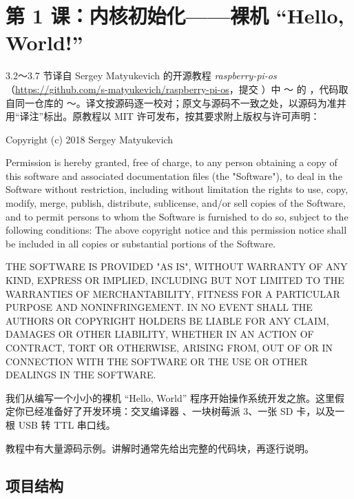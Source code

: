 \section{第 1 课：内核初始化——裸机 “Hello, World!”}
\label{sec:rpios-l1}

\begin{note}
  3.2～3.7 节译自 Sergey Matyukevich 的开源教程 \emph{raspberry-pi-os}（\url{https://github.com/s-matyukevich/raspberry-pi-os}，提交 ）中 ～ 的 ，代码取自同一仓库的 ～。译文按源码逐一校对；原文与源码不一致之处，以源码为准并用“译注”标出。原教程以 MIT 许可发布，按其要求附上版权与许可声明：

  \smallskip
  {\footnotesize\ttfamily\raggedright
  Copyright (c) 2018 Sergey Matyukevich\par
  Permission is hereby granted, free of charge, to any person obtaining a copy of this software and associated documentation files (the "Software"), to deal in the Software without restriction, including without limitation the rights to use, copy, modify, merge, publish, distribute, sublicense, and/or sell copies of the Software, and to permit persons to whom the Software is furnished to do so, subject to the following conditions: The above copyright notice and this permission notice shall be included in all copies or substantial portions of the Software.\par
  THE SOFTWARE IS PROVIDED "AS IS", WITHOUT WARRANTY OF ANY KIND, EXPRESS OR IMPLIED, INCLUDING BUT NOT LIMITED TO THE WARRANTIES OF MERCHANTABILITY, FITNESS FOR A PARTICULAR PURPOSE AND NONINFRINGEMENT. IN NO EVENT SHALL THE AUTHORS OR COPYRIGHT HOLDERS BE LIABLE FOR ANY CLAIM, DAMAGES OR OTHER LIABILITY, WHETHER IN AN ACTION OF CONTRACT, TORT OR OTHERWISE, ARISING FROM, OUT OF OR IN CONNECTION WITH THE SOFTWARE OR THE USE OR OTHER DEALINGS IN THE SOFTWARE.\par}
\end{note}

我们从编写一个小小的裸机 “Hello, World” 程序开始操作系统开发之旅。这里假定你已经准备好了开发环境：交叉编译器 、一块树莓派 3、一张 SD 卡，以及一根 USB 转 TTL 串口线。

教程中有大量源码示例。讲解时通常先给出完整的代码块，再逐行说明。

\subsection{项目结构}

